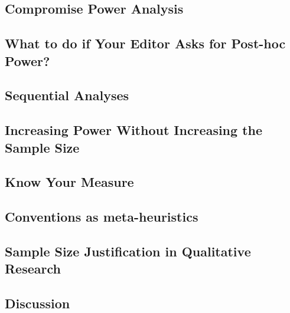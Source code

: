 \documentclass[
  oneside]{krantz}
\begin{document}
\hypertarget{compromise-power-analysis}{%
\subsection{Compromise Power Analysis}\label{compromise-power-analysis}}

\hypertarget{posthocpower}{%
\subsection{What to do if Your Editor Asks for Post-hoc
Power?}\label{posthocpower}}

\hypertarget{sequentialsamplesize}{%
\subsection{Sequential Analyses}\label{sequentialsamplesize}}

\hypertarget{increasing-power-without-increasing-the-sample-size}{%
\subsection{Increasing Power Without Increasing the Sample
Size}\label{increasing-power-without-increasing-the-sample-size}}

\hypertarget{know-your-measure}{%
\subsection{Know Your Measure}\label{know-your-measure}}

\hypertarget{conventions-as-meta-heuristics}{%
\subsection{Conventions as
meta-heuristics}\label{conventions-as-meta-heuristics}}

\hypertarget{sample-size-justification-in-qualitative-research}{%
\subsection{Sample Size Justification in Qualitative
Research}\label{sample-size-justification-in-qualitative-research}}

\hypertarget{discussion}{%
\subsection{Discussion}\label{discussion}}
\end{document}
